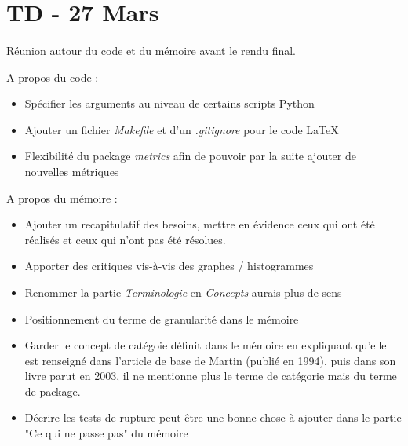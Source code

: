 \documentclass{scrartcl}
\begin{document}
\section{TD - 27 Mars}
\paragraph{}Réunion autour du code et du mémoire avant le rendu final.

A propos du code : 
\begin{itemize}
    \item Spécifier les arguments au niveau de certains scripts Python
    \item Ajouter un fichier \emph{Makefile} et d'un \emph{.gitignore} pour le code \LaTeX{}
    \item Flexibilité du package \emph{metrics} afin de pouvoir par la suite ajouter de nouvelles métriques
\end{itemize}

A propos du mémoire :
\begin{itemize}
    \item Ajouter un recapitulatif des besoins, mettre en évidence ceux qui ont été réalisés et ceux qui n'ont pas été résolues.
    \item Apporter des critiques vis-à-vis des graphes / histogrammes
    \item Renommer la partie \emph{Terminologie} en \emph{Concepts} aurais plus de sens
    \item Positionnement du terme de granularité dans le mémoire
    \item Garder le concept de catégoie définit dans le mémoire en expliquant qu'elle est renseigné dans l'article de base de Martin (publié en 1994), puis dans son livre parut en 2003, il ne mentionne plus le terme de catégorie mais du terme de package.
    \item Décrire les tests de rupture peut être une bonne chose à ajouter dans le partie "Ce qui ne passe pas" du mémoire 
    
\end{itemize}
\end{document}
